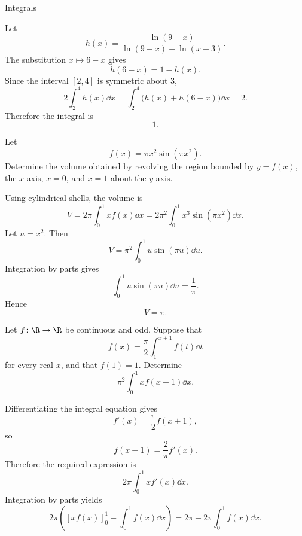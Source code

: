 \begin{expectedproblemgroup}{Integrals}
        \begin{expectedsubsolution}
            Let
            \[
                h(x)
                =
                \frac{\ln(9-x)}{
                    \ln(9-x)+\ln(x+3)
                }.
            \]
            The substitution $x\mapsto6-x$ gives
            \[
                h(6-x)=1-h(x).
            \]
            Since the interval $[2,4]$ is symmetric about $3$,
            \[
                2\int_2^4h(x)\dd x
                =
                \int_2^4\bigl(h(x)+h(6-x)\bigr)\dd x
                =2.
            \]
            Therefore the integral is
            \[
                \boxed{1}.
            \]
        \end{expectedsubsolution}

        \begin{expectedsubproblem}
            Let
            \[
                f(x)=\pi x^2\sin(\pi x^2).
            \]
            Determine the volume obtained by revolving the region bounded by
            $y=f(x)$, the $x$-axis, $x=0$, and $x=1$ about the $y$-axis.
        \end{expectedsubproblem}

        \begin{expectedsubsolution}
            Using cylindrical shells, the volume is
            \[
                V
                =
                2\pi\int_0^1x f(x)\dd x
                =
                2\pi^2\int_0^1x^3\sin(\pi x^2)\dd x.
            \]
            Let $u=x^2$. Then
            \[
                V
                =
                \pi^2\int_0^1u\sin(\pi u)\dd u.
            \]
            Integration by parts gives
            \[
                \int_0^1u\sin(\pi u)\dd u=\frac1\pi.
            \]
            Hence
            \[
                \boxed{V=\pi}.
            \]
        \end{expectedsubsolution}

        \begin{expectedsubproblem}[2014 CSAT]
            Let $f\colon\R\to\R$ be continuous and odd. Suppose that
            \[
                f(x)
                =
                \frac{\pi}{2}
                \int_1^{x+1}f(t)\dd t
            \]
            for every real $x$, and that $f(1)=1$. Determine
            \[
                \pi^2\int_0^1x f(x+1)\dd x.
            \]
        \end{expectedsubproblem}

        \begin{expectedsubsolution}
            Differentiating the integral equation gives
            \[
                f'(x)=\frac{\pi}{2}f(x+1),
            \]
            so
            \[
                f(x+1)=\frac{2}{\pi}f'(x).
            \]
            Therefore the required expression is
            \[
                2\pi\int_0^1x f'(x)\dd x.
            \]
            Integration by parts yields
            \[
                2\pi\left(
                    [xf(x)]_0^1-\int_0^1f(x)\dd x
                \right)
                =
                2\pi-2\pi\int_0^1f(x)\dd x.
            \]


\end{expectedsubsolution}
\end{expectedproblemgroup}
